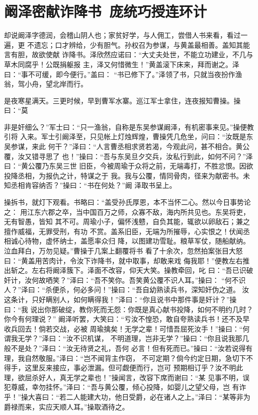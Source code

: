 \chapter{阚泽密献诈降书~庞统巧授连环计}

却说阚泽字德润，会稽山阴人也；家贫好学，与人佣工，尝借人书来看，看过一遍，更
不遗忘；口才辨给，少有胆气。孙权召为参谋，与黄盖最相善。盖知其能言有胆，故欲使献
诈降书。泽欣然应诺曰：“大丈夫处世，不能立功建业，不几与草木同腐乎！公既捐躯报
主，泽又何惜微生！”黄盖滚下床来，拜而谢之。泽曰：“事不可缓，即今便行。”盖曰：
“书已修下了。”泽领了书，只就当夜扮作渔翁，驾小舟，望北岸而行。

是夜寒星满天。三更时候，早到曹军水寨。巡江军士拿住，连夜报知曹操。操曰：“莫

非是奸细么？”军士曰：“只一渔翁，自称是东吴参谋阚泽，有机密事来见。”操便教引将
入来。军士引阚泽至，只见帐上灯烛辉煌，曹操凭几危坐，问曰：“汝既是东吴参谋，来此
何干？”泽曰：“人言曹丞相求贤若渴，今观此问，甚不相合。黄公覆，汝又错寻思了
也！”操曰：“吾与东吴旦夕交兵，汝私行到此，如何不问？”泽曰：“黄公覆乃东吴三世
旧臣，今被周瑜于众将之前，无端毒打，不胜忿恨。因欲投降丞相，为报仇之计，特谋之于
我。我与公覆，情同骨肉，径来为献密书。未知丞相肯容纳否？”操曰：“书在何处？”阚
泽取书呈上。

操拆书，就灯下观看。书略曰：“盖受孙氏厚恩，本不当怀二心。然以今日事势论之：
用江东六郡之卒，当中国百万之师，众寡不敌，海内所共见也。东吴将吏，无有智愚，皆知
其不可。周瑜小子，偏怀浅戆，自负其能，辄欲以卵敌石；兼之擅作威福，无罪受刑，有功
不赏。盖系旧臣，无端为所摧辱，心实恨之！伏闻丞相诚心待物，虚怀纳士，盖愿率众归
降，以图建功雪耻。粮草军仗，随船献纳。泣血拜白，万勿见疑。”曹操于几案上翻覆将书
看了十余次，忽然拍案张目大怒曰：“黄盖用苦肉计，令汝下诈降书，就中取事，却敢来戏
侮我耶！”便教左右推出斩之。左右将阚泽簇下。泽面不改容，仰天大笑。操教牵回，叱
曰：“吾已识破奸计，汝何故哂笑？”泽曰：“吾不笑你。吾笑黄公覆不识人耳。”操曰：
“何不识人？”泽曰：“杀便杀，何必多问！”操曰：“吾自幼熟读兵书，深知奸伪之道。
汝这条计，只好瞒别人，如何瞒得我！”泽曰：“你且说书中那件事是奸计？”操曰：“我
说出你那破绽，教你死而无怨：你既是真心献书投降，如何不明约几时？你今有何理说？”
阚泽听罢，大笑曰：“亏汝不惶恐，敢自夸熟读兵书！还不及早收兵回去！倘若交战，必被
周瑜擒矣！无学之辈！可惜吾屈死汝手！”操曰：“何谓我无学？”泽曰：“汝不识机谋，
不明道理，岂非无学？”操曰：“你且说我那几般不是处？”泽曰：“汝无待贤之礼，吾何
必言！但有死而已。”操曰：“汝若说得有理，我自然敬服。”泽曰：“岂不闻背主作窃，
不可定期？倘今约定日期，急切下不得手，这里反来接应，事必泄漏。但可觑便而行，岂可
预期相订乎？汝不明此理，欲屈杀好人，真无学之辈也！”操闻言，改容下席而谢曰：“某
见事不明，误犯尊威，幸勿挂怀。”泽曰：“吾与黄公覆，倾心投降，如婴儿之望父母，岂
有诈乎！”操大喜曰：“若二人能建大功，他日受爵，必在诸人之上。”泽曰：“某等非为
爵禄而来，实应天顺人耳。”操取酒待之。

